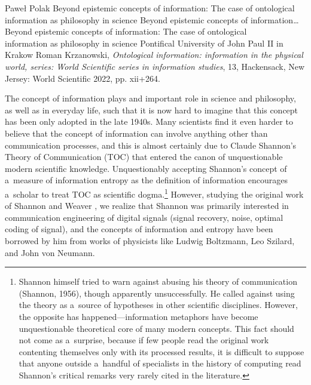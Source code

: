 \begin{newrevengenv}{Paweł Polak}
	{Beyond epistemic concepts of information: The case of ontological information as philosophy in science}
	{Beyond epistemic concepts of information\ldots}
	{Beyond epistemic concepts of information: The case of ontological\\information as philosophy in science}
	{Pontifical University of John Paul II in Krakow}
	{Roman Krzanowski, \textit{Ontological information: information in the physical world, series: World Scientific series in information studies}, 13, Hackensack, New Jersey: World Scientific 2022, pp. xii+264.}
	
	
	
%
%
%

\lettrine[loversize=0.13,lines=2,lraise=-0.03,nindent=0em,findent=0.2pt]%
{T}{}he concept of information plays and important role in science and philosophy, as well as in everyday life, such that it is now hard to imagine that this concept has been only adopted in the late 1940s. Many scientists find it even harder to believe that the concept of information can involve anything other than communication processes, and this is almost certainly due to Claude Shannon's Theory of Communication (TOC)
\parencite*[][]{shannon_mathematical_1949} %
 that entered the canon of unquestionable modern scientific knowledge. Unquestionably accepting Shannon's concept of a~measure of information entropy as the definition of information encourages a~scholar to treat TOC as scientific dogma.\footnote{ Shannon himself tried to warn against abusing his theory of communication (Shannon, 1956), though apparently unsuccessfully. He called against using the theory as a~source of hypotheses in other scientific disciplines. However, the opposite has happened—information metaphors have become unquestionable theoretical core of many modern concepts. This fact should not come as a~surprise, because if few people read the original work contenting themselves only with its processed results, it is difficult to suppose that anyone outside a~handful of specialists in the history of computing read Shannon's critical remarks very rarely cited in the literature.} However, studying the original work of Shannon and Weaver 
\parencite*[][p.3]{shannon_mathematical_1964}, %
 we realize that Shannon was primarily interested in communication engineering of digital signals (signal recovery, noise, optimal coding of signal), and the concepts of information and entropy have been borrowed by him from works of physicists like Ludwig Boltzmann, Leo Szilard, and John von Neumann.


\end{newrevengenv}

